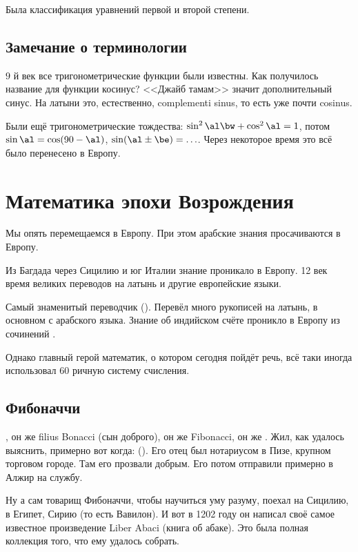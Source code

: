 \documentclass[a4paper,oneside,fleqn,10pt]{article}
\begin{document}
Была классификация уравнений первой и второй степени.

\subsection{Замечание о терминологии}

$9$ й век все тригонометрические функции были известны. Как получилось
название для функции косинус?  <<Джайб тамам>> значит дополнительный
синус. На латыни это, естественно, complementi sinus, то есть уже
почти cosinus.

Были ещё тригонометрические тождества: $\sin^2 \al \bw+ \cos^2\al =
1$, потом $\sin \al = \cos(90-\al)$, $\sin({\al \pm\be}) = \ldots$.
Через некоторое время это всё было перенесено в Европу.


\section{Математика эпохи Возрождения}

Мы опять перемещаемся в Европу. При этом арабские знания просачиваются
в Европу.

Из Багдада через Сицилию и юг Италии знание проникало в Европу.  12
век время великих переводов на латынь и другие европейские языки.

Самый знаменитый переводчик 
().  Перевёл много рукописей на латынь, в основном с
арабского языка.  Знание об индийском счёте проникло в Европу из
сочинений .

Однако главный герой математик, о котором сегодня пойдёт речь, всё
таки иногда использовал 60 ричную систему счисления.

\subsection{Фибоначчи}

, он же filius Bonacci (сын доброго), он же
Fibonacci, он же . Жил, как удалось выяснить, примерно
вот когда: ().  Его отец был нотариусом в
Пизе, крупном торговом городе.  Там его прозвали добрым. Его потом
отправили примерно в Алжир на службу.

Ну а сам товарищ Фибоначчи, чтобы научиться уму разуму, поехал на
Сицилию, в Египет, Сирию (то есть Вавилон).  И вот в 1202 году он
написал своё самое известное произведение Liber Abaci (книга об
абаке).  Это была полная коллекция того, что ему удалось собрать.
\end{document}
